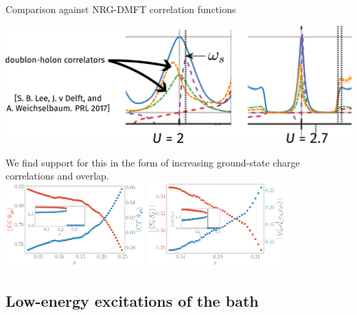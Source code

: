 \documentclass[8pt,aspectratio=169]{beamer}
\begin{document}
\begin{frame}{Comparison against NRG-DMFT correlation functions}
{\begin{minipage}{0.65\textwidth}
\begin{center}
\includegraphics[width=\textwidth]{doublon-holon-correlators.pdf}
\end{center}
\end{minipage}

We find support for this in the form of \alert{increasing ground-state charge correlations and overlap}.\\[5pt]
\includegraphics[width=0.4\textwidth]{corrs_gs.pdf}
\hspace*{\fill}
\includegraphics[width=0.4\textwidth]{pairing.pdf}
}
\end{frame}

\begin{frame}{}
\section{Low-energy excitations of the bath}
\end{frame}
\end{document}

